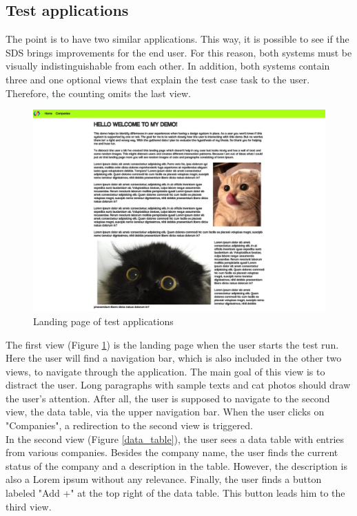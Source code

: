 \newpage
\subsection{Test applications}
The point is to have two similar applications. This way, it is possible to see if the SDS brings improvements for the end user. For this reason, both systems must be visually indistinguishable from each other. In addition, both systems contain three and one optional views that explain the test case task to the user. Therefore, the counting omits the last view.  \\

\begin{figure}[hbtp]
    \centerline{\includegraphics[width=\linewidth, draft=false]{images/demo_view_landing_page.png}}
    \caption{Landing page of test applications}
    \label{landing_page}
\end{figure}
The first view (Figure \ref{landing_page}) is the landing page when the user starts the test run. Here the user will find a navigation bar, which is also included in the other two views, to navigate through the application. The main goal of this view is to distract the user. Long paragraphs with sample texts and cat photos should draw the user's attention. After all, the user is supposed to navigate to the second view, the data table, via the upper navigation bar. When the user clicks on "Companies", a redirection to the second view is triggered. \\
\newpage
In the second view (Figure \ref{data_table}), the user sees a data table with entries from various companies. Besides the company name, the user finds the current status of the company and a description in the table. However, the description is also a Lorem ipsum without any relevance. Finally, the user finds a button labeled "Add +" at the top right of the data table. This button leads him to the third view.  \\

